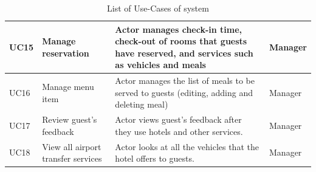 \begin{table}
\begin{tabular}{|>{\raggedright\arraybackslash}p{1cm}|>{\raggedright\arraybackslash}p{3cm}|>{\raggedright\arraybackslash}p{8cm}|>{\raggedright\arraybackslash}p{3cm}|}
\hline 
UC15& Manage reservation & Actor manages check-in time, check-out of rooms that guests have reserved, and services such as vehicles and meals & Manager\\
\hline 
UC16& Manage menu item& Actor manages the list of meals to be served to guests (editing, adding and deleting meal) & Manager\\
\hline 
UC17& Review guest's feedback& Actor views guest's feedback after they use hotels and other services.
 & Manager\\
\hline 
UC18& View all airport transfer services& Actor looks at all the vehicles that the hotel offers to guests. & Manager\\
\hline 
\end{tabular}
\caption{List of Use-Cases of system}
\label{tab:use-cases}
\end{table}


